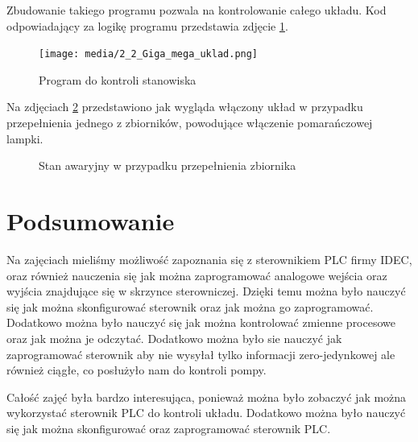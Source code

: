 \documentclass{article}
\begin{document}
Zbudowanie takiego programu pozwala na kontrolowanie całego układu. Kod odpowiadający za logikę programu przedstawia zdjęcie \ref{fig:zdj11}.

\begin{figure}[H]
    \centering
    \texttt{[image: media/2\_2\_Giga\_mega\_uklad.png]}
    \caption{Program do kontroli stanowiska}
    \label{fig:zdj11}
\end{figure}

Na zdjęciach \ref{fig:main2} przedstawiono jak wygląda włączony układ w przypadku przepełnienia jednego z zbiorników, powodujące włączenie pomarańczowej lampki. 

\begin{figure}[H]
    \centering
    \caption{Stan awaryjny w przypadku przepełnienia zbiornika}
    \label{fig:main2}
\end{figure}

\newpage
\section{Podsumowanie}
Na zajęciach mieliśmy możliwość zapoznania się z sterownikiem PLC firmy IDEC, oraz również nauczenia się jak można zaprogramować analogowe wejścia oraz wyjścia znajdujące się w skrzynce sterowniczej.
Dzięki temu można było nauczyć się jak można skonfigurować sterownik oraz jak można go zaprogramować. Dodatkowo można było nauczyć się jak można kontrolować zmienne procesowe oraz jak można je odczytać.
Dodatkowo można było sie nauczyć jak zaprogramować sterownik aby nie wysyłał tylko informacji zero-jedynkowej ale również ciągłe, co posłużyło nam do kontroli pompy.

Całość zajęć była bardzo interesująca, ponieważ można było zobaczyć jak można wykorzystać sterownik PLC do kontroli układu. Dodatkowo można było nauczyć się jak można skonfigurować oraz zaprogramować sterownik PLC.
\end{document}
